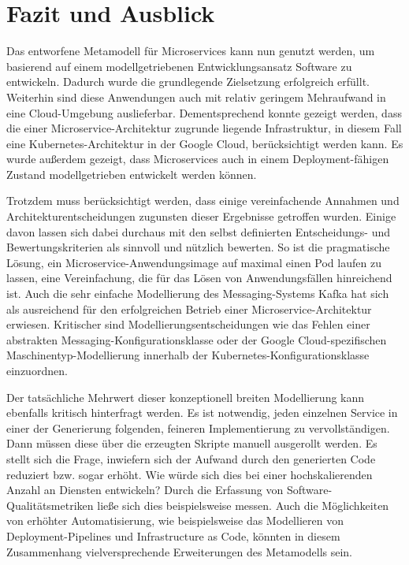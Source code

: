 \chapter{Fazit und Ausblick}

Das entworfene Metamodell für Microservices kann nun genutzt werden, um basierend auf einem modellgetriebenen Entwicklungsansatz Software zu entwickeln. Dadurch wurde die grundlegende Zielsetzung erfolgreich erfüllt. Weiterhin sind diese Anwendungen auch mit relativ geringem Mehraufwand in eine Cloud-Umgebung auslieferbar. Dementsprechend konnte gezeigt werden, dass die einer Microservice-Architektur zugrunde liegende Infrastruktur, in diesem Fall eine Kubernetes-Architektur in der Google Cloud, berücksichtigt werden kann. Es wurde außerdem gezeigt, dass Microservices auch in einem Deployment-fähigen Zustand modellgetrieben entwickelt werden können.

Trotzdem muss berücksichtigt werden, dass einige vereinfachende Annahmen und Architekturentscheidungen zugunsten dieser Ergebnisse getroffen wurden. Einige davon lassen sich dabei durchaus mit den selbst definierten Entscheidungs- und Bewertungskriterien als sinnvoll und nützlich bewerten. So ist die pragmatische Lösung, ein Microservice-Anwendungsimage auf maximal einen Pod laufen zu lassen, eine Vereinfachung, die für das Lösen von Anwendungsfällen hinreichend ist. Auch die sehr einfache Modellierung des Messaging-Systems Kafka hat sich als ausreichend für den erfolgreichen Betrieb einer Microservice-Architektur erwiesen. Kritischer sind Modellierungsentscheidungen wie das Fehlen einer abstrakten Messaging-Konfigurationsklasse oder der Google Cloud-spezifischen Maschinentyp-Modellierung innerhalb der Kubernetes-Konfigurationsklasse einzuordnen.

Der tatsächliche Mehrwert dieser konzeptionell breiten Modellierung kann ebenfalls kritisch hinterfragt werden. Es ist notwendig, jeden einzelnen Service in einer der Generierung folgenden, feineren Implementierung zu vervollständigen. Dann müssen diese über die erzeugten Skripte manuell ausgerollt werden. Es stellt sich die Frage, inwiefern sich der Aufwand durch den generierten Code reduziert bzw. sogar erhöht. Wie würde sich dies bei einer hochskalierenden Anzahl an Diensten entwickeln? Durch die Erfassung von Software-Qualitätsmetriken ließe sich dies beispielsweise messen. Auch die Möglichkeiten von erhöhter Automatisierung, wie beispielsweise das Modellieren von Deployment-Pipelines und Infrastructure as Code, könnten in diesem Zusammenhang vielversprechende Erweiterungen des Metamodells sein.

